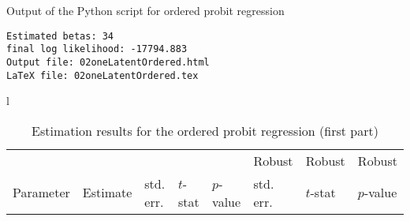 \documentclass[12pt,a4paper]{article}
\begin{document}
\begin{table}[htb]
\caption{\label{tab:ordered_output}Output of the Python script for
  ordered probit regression}
  \begin{lstlisting}
Estimated betas: 34
final log likelihood: -17794.883
Output file: 02oneLatentOrdered.html
LaTeX file: 02oneLatentOrdered.tex
  \end{lstlisting}
\end{table}
\begin{sidewaystable}[htb]
\caption{\label{tab:ordered}Estimation results for the ordered probit
  regression (first part)}
  \begin{tabular}{l}
\begin{tabular}{lr@{.}lr@{.}lr@{.}lr@{.}lr@{.}lr@{.}lr@{.}l}
                      &   \multicolumn{2}{l}{}    & \multicolumn{2}{l}{} & \multicolumn{2}{l}{}  &     \multicolumn{2}{l}{} &   \multicolumn{2}{l}{Robust}    & \multicolumn{2}{l}{Robust}  &     \multicolumn{2}{l}{Robust}   \\
Parameter      & \multicolumn{2}{l}{Estimate}  &
\multicolumn{2}{l}{std. err.}  &  \multicolumn{2}{l}{$t$-stat}  &   \multicolumn{2}{l}{$p$-value}  &
\multicolumn{2}{l}{std. err.}  &  \multicolumn{2}{l}{$t$-stat}  &   \multicolumn{2}{l}{$p$-value}   \\
\hline


\end{tabular}
\end{tabular}
\end{sidewaystable}
\end{document}
